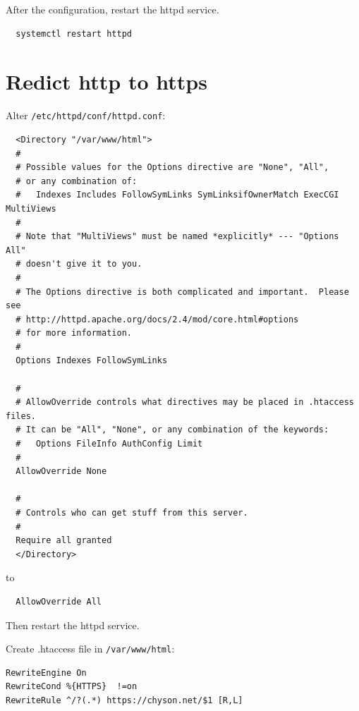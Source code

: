 After the configuration, restart the httpd service.
\begin{lstlisting}
  systemctl restart httpd
\end{lstlisting}


\section{Redict http to https}

Alter \verb|/etc/httpd/conf/httpd.conf|:
\begin{lstlisting}
  <Directory "/var/www/html">
  #
  # Possible values for the Options directive are "None", "All",
  # or any combination of:
  #   Indexes Includes FollowSymLinks SymLinksifOwnerMatch ExecCGI MultiViews
  #
  # Note that "MultiViews" must be named *explicitly* --- "Options All"
  # doesn't give it to you.
  #
  # The Options directive is both complicated and important.  Please see
  # http://httpd.apache.org/docs/2.4/mod/core.html#options 
  # for more information.
  #
  Options Indexes FollowSymLinks

  #
  # AllowOverride controls what directives may be placed in .htaccess files.
  # It can be "All", "None", or any combination of the keywords:
  #   Options FileInfo AuthConfig Limit
  #
  AllowOverride None

  #
  # Controls who can get stuff from this server.
  #
  Require all granted
  </Directory>
\end{lstlisting}
to
\begin{lstlisting}
  AllowOverride All  
\end{lstlisting}

Then restart the httpd service.


Create .htaccess file in \verb|/var/www/html|:
\begin{tcolorbox}
\begin{verbatim}
RewriteEngine On 
RewriteCond %{HTTPS}  !=on 
RewriteRule ^/?(.*) https://chyson.net/$1 [R,L]
\end{verbatim}
\end{tcolorbox}


